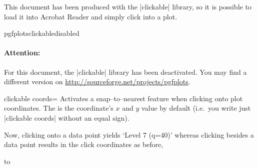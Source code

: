 	This document has been produced with the |clickable| library, so it is possible to load it into Acrobat Reader and simply click into a plot.
	
	\expandafter\ifx\csname pgfplotsclickabledisabled\endcsname\relax
	\else
	\paragraph{Attention:} For this document, the |clickable| library has been deactivated. You may find a different version on \url{http://sourceforge.net/projects/pgfplots}.
	\fi

\begin{pgfplotskey}{clickable coords=}
	Activates a snap--to--nearest feature when clicking onto plot coordinates. The  is the coordinate's $x$ and $y$ value by default (i.e.\ you write just |clickable coords| without an equal sign).
\begin{codeexample}[]
\end{codeexample}
	\noindent Now, clicking onto a data point yields `Level 7 (q=40)' 
	whereas clicking besides a data point results in the click coordinates as before,
	
	\noindent\hbox to %


\end{pgfplotskey}
